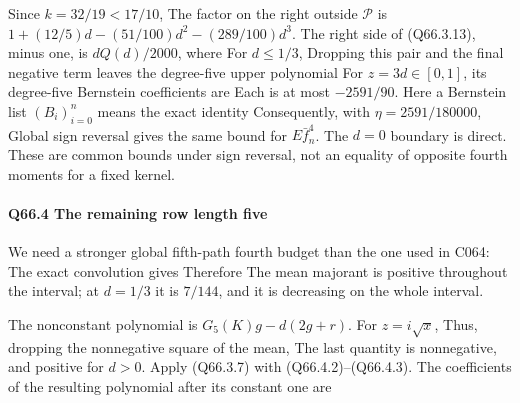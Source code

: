 Since \(k=32/19<17/10\),
The factor on the right outside \(\mathcal P\) is
\(1+(12/5)d-(51/100)d^2-(289/100)d^3\).
The right side of (Q66.3.13), minus one, is \(dQ(d)/2000\), where
For \(d\le1/3\),
Dropping this pair and the final negative term leaves the
degree-five upper polynomial
For \(z=3d\in[0,\allowbreak  1]\), its degree-five Bernstein coefficients are
Each is at most \(-2591/90\).
Here a Bernstein list \((B_i)_{i=0}^n\) means the exact identity
Consequently, with \(\eta=2591/180000\),
Global sign reversal gives the same bound for \(E\bar f_n^4\).
The \(d=0\) boundary is direct. These are common bounds under sign
reversal, not an equality of opposite fourth moments for a fixed
kernel.

\paragraph{Q66.4 The remaining row length five}

We need a stronger global fifth-path fourth budget than the one
used in C064:
The exact convolution gives
Therefore
The mean majorant is positive throughout the interval; at \(d=1/3\)
it is \(7/144\), and it is decreasing on the whole interval.

The nonconstant polynomial is \(G_5(K)g-d(2g+r)\).
For \(z=i\sqrt x\),
Thus, dropping the nonnegative square of the mean,
The last quantity is nonnegative, and positive for \(d>0\).
Apply (Q66.3.7) with (Q66.4.2)--(Q66.4.3).
The coefficients of the resulting polynomial after its constant one
are


